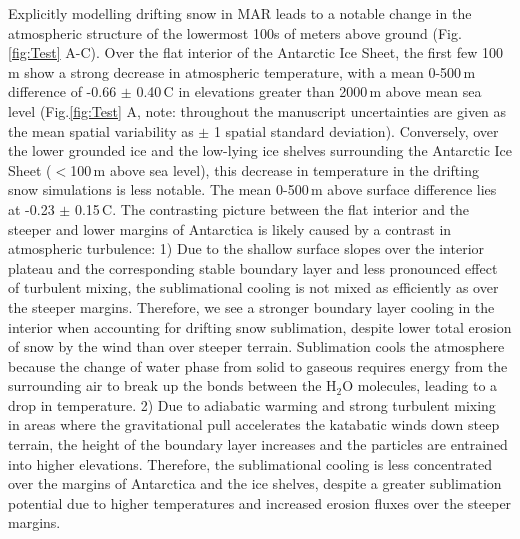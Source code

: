 \documentclass[draft]{agujournal2019}
\begin{document}
Explicitly modelling drifting snow in MAR leads to a notable change in the atmospheric structure of the lowermost 100s of meters above ground (Fig.\ref{fig:Test} A-C). Over the flat interior of the Antarctic Ice Sheet, the first few 100\,m show a strong decrease in atmospheric temperature, with a mean 0-500\,m difference of -0.66 $\pm$ 0.40\,\textdegree C in elevations greater than 2000\,m above mean sea level (Fig.\ref{fig:Test} A, note: throughout the manuscript uncertainties are given as the mean spatial variability as $\pm$ 1 spatial standard deviation). Conversely, over the lower grounded ice and the low-lying ice shelves surrounding the Antarctic Ice Sheet ($<$100\,m above sea level), this decrease in temperature in the drifting snow simulations is less notable. The mean 0-500\,m above surface difference lies at -0.23 $\pm$ 0.15\,\textdegree C. The contrasting picture between the flat interior and the steeper and lower margins of Antarctica is likely caused by a contrast in atmospheric turbulence: 1) Due to the shallow surface slopes over the interior plateau and the corresponding stable boundary layer and less pronounced effect of turbulent mixing, the sublimational cooling is not mixed as efficiently as over the steeper margins. Therefore, we see a stronger boundary layer cooling in the interior when accounting for drifting snow sublimation, despite lower total erosion of snow by the wind than over steeper terrain. Sublimation cools the atmosphere because the change of water phase from solid to gaseous requires energy from the surrounding air to break up the bonds between the H$_2$O molecules, leading to a drop in temperature. 2) Due to adiabatic warming and strong turbulent mixing in areas where the gravitational pull accelerates the katabatic winds down steep terrain, the height of the boundary layer increases and the particles are entrained into higher elevations. Therefore, the sublimational cooling is less concentrated over the margins of Antarctica and the ice shelves, despite a greater sublimation potential due to higher temperatures and increased erosion fluxes over the steeper margins.
\end{document}

